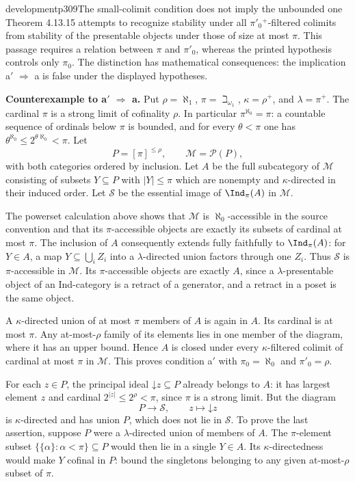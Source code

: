 \begin{dcomment}{development}{p309}{The small-colimit condition does not imply the unbounded one}
Theorem 4.13.15 attempts to recognize stability under all $\pi'_0{}^+$-filtered colimits from stability of the presentable objects under those of size at most $\pi$. This passage requires a relation between $\pi$ and $\pi'_0$, whereas the printed hypothesis controls only $\pi_0$. The distinction has mathematical consequences: the implication a$'$ $\Rightarrow$ a is false under the displayed hypotheses.

\textbf{Counterexample to a$'$ $\Rightarrow$ a.}\ours
Put $\rho=\aleph_1$, $\pi=\beth_{\omega_1}$, $\kappa=\rho^+$, and $\lambda=\pi^+$. The cardinal $\pi$ is a strong limit of cofinality $\rho$. In particular $\pi^{\aleph_0}=\pi$: a countable sequence of ordinals below $\pi$ is bounded, and for every $\theta<\pi$ one has $\theta^{\aleph_0}\leq 2^{\theta\aleph_0}<\pi$. Let
\[
 P=[\pi]^{\leq\rho},\qquad \mathcal M=\mathcal P(P),
\]
with both categories ordered by inclusion. Let $A$ be the full subcategory of $\mathcal M$ consisting of subsets $Y\subseteq P$ with $|Y|\leq\pi$ which are nonempty and $\kappa$-directed in their induced order. Let $\mathcal S$ be the essential image of $\Ind_\pi(A)$ in $\mathcal M$.

The powerset calculation above shows that $\mathcal M$ is $\aleph_0$-accessible in the source convention and that its $\pi$-accessible objects are exactly its subsets of cardinal at most $\pi$. The inclusion of $A$ consequently extends fully faithfully to $\Ind_\pi(A)$: for $Y\in A$, a map $Y\subseteq\bigcup_iZ_i$ into a $\lambda$-directed union factors through one $Z_i$. Thus $\mathcal S$ is $\pi$-accessible in $\mathcal M$. Its $\pi$-accessible objects are exactly $A$, since a $\lambda$-presentable object of an Ind-category is a retract of a generator, and a retract in a poset is the same object.

A $\kappa$-directed union of at most $\pi$ members of $A$ is again in $A$. Its cardinal is at most $\pi$. Any at-most-$\rho$ family of its elements lies in one member of the diagram, where it has an upper bound. Hence $A$ is closed under every $\kappa$-filtered colimit of cardinal at most $\pi$ in $\mathcal M$. This proves condition a$'$ with $\pi_0=\aleph_0$ and $\pi'_0=\rho$.

For each $z\in P$, the principal ideal $\mathord\downarrow z\subseteq P$ already belongs to $A$: it has largest element $z$ and cardinal $2^{|z|}\leq 2^\rho<\pi$, since $\pi$ is a strong limit. But the diagram
\[
 P\longrightarrow\mathcal S,\qquad z\longmapsto\mathord\downarrow z
\]
is $\kappa$-directed and has union $P$, which does not lie in $\mathcal S$. To prove the last assertion, suppose $P$ were a $\lambda$-directed union of members of $A$. The $\pi$-element subset $\{\{\alpha\}:\alpha<\pi\}\subseteq P$ would then lie in a single $Y\in A$. Its $\kappa$-directedness would make $Y$ cofinal in $P$: bound the singletons belonging to any given at-most-$\rho$ subset of $\pi$.


\end{dcomment}
